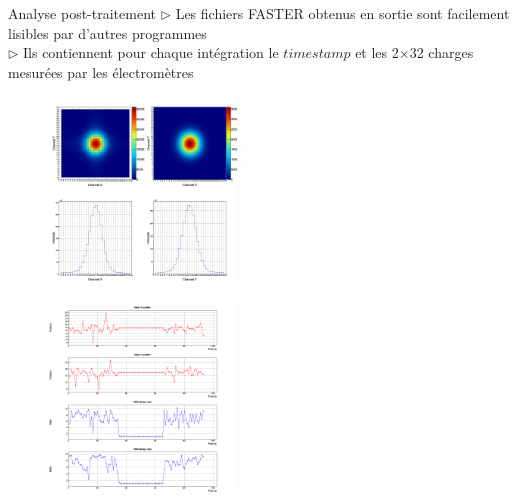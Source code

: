 \documentclass[10pt]{beamer}
\begin{document}
\begin{frame}[fragile]{Analyse post-traitement}
$\rhd$ Les fichiers FASTER obtenus en sortie sont facilement lisibles par d'autres programmes\\
$\rhd$ Ils contiennent pour chaque intégration le $timestamp$ et les 2$\times$32 charges mesurées par les électromètres

\vspace{2ex}
\begin{minipage}[h]{.48\linewidth}
\begin{figure}[h]
\begin{center}
\includegraphics[width=5cm]{Fluence_reconstruction.png}
\end{center}
\end{figure}
\end{minipage}
\hfill
\begin{minipage}[h]{.48\linewidth}
\begin{figure}[h]
\begin{center}
\includegraphics[width=5cm]{Sampling.png}
\end{center}
\end{figure}
\end{minipage}
\end{frame}
\end{document}
